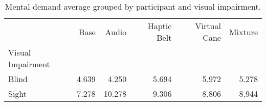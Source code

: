 
\begin{table}[!htb]
\centering
\caption{Mental demand average grouped by participant and visual impairment.}
\label{tab:md_average_group}
\begin{tabular}{lrrrrr}
\toprule
{} &  Base &  Audio &  Haptic Belt &  Virtual Cane &  Mixture \\
Visual Impairment &       &        &              &               &          \\
\midrule
Blind             & 4.639 &  4.250 &        5.694 &         5.972 &    5.278 \\
Sight             & 7.278 & 10.278 &        9.306 &         8.806 &    8.944 \\
\bottomrule
\end{tabular}
\end{table}

